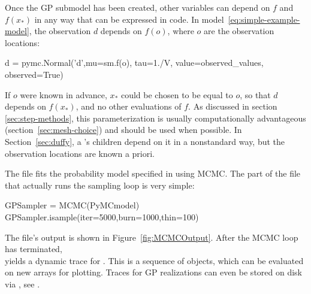 \documentclass[article]{jss}
\begin{document}
Once the GP submodel has been created, other variables can depend on $f$ and $f(x_*)$ in any way that can be expressed in  code. In model~\ref{eq:simple-example-model}, the observation $d$ depends on $f(o)$, where $o$ are the observation locations:
\begin{CodeChunk}
\begin{CodeInput}
d = pymc.Normal('d',mu=sm.f(o), tau=1./V, value=observed_values, observed=True)
\end{CodeInput}
\end{CodeChunk}
If $o$ were known in advance, $x_*$ could be chosen to be equal to $o$, so that $d$ depends on $f(x_*)$, and no other evaluations of $f$. As discussed in section \ref{sec:step-methods}, this parameterization is usually computationally advantageous (section~\ref{sec:mesh-choice}) and should be used when possible. In Section~\ref{sec:duffy}, a 's children depend on it in a nonstandard way, but the observation locations are known a priori. 

The file  fits the probability model specified in  using MCMC. The part of the file that actually runs the sampling loop is very simple:
\begin{CodeChunk}
\begin{CodeInput}
GPSampler = MCMC(PyMCmodel)
GPSampler.isample(iter=5000,burn=1000,thin=100)    
\end{CodeInput}
\end{CodeChunk}
The file's output is shown in Figure~\ref{fig:MCMCOutput}. After the MCMC loop has terminated, \\ yields a dynamic trace for . This is a sequence of  objects, which can be evaluated on new arrays for plotting. Traces for GP realizations can even be stored on disk via  \citep{tables}, see \cite{pymc}.

\end{document}
